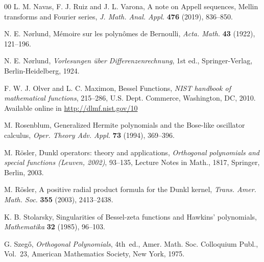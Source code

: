 \documentclass[a4paper]{amsart}
\theoremstyle{plain}
\theoremstyle{definition}
\theoremstyle{remark}
\numberwithin{equation}{section}
\begin{document}
\begin{thebibliography}{00}
L. M. Navas, F. J. Ruiz and J. L. Varona,
A note on Appell sequences, Mellin transforms and Fourier series,
\textit{J. Math. Anal. Appl.}
\textbf{476} (2019), 836--850.

N. E. N{\o}rlund, %
M\'emoire sur les polyn\^omes de Bernoulli,
\textit{Acta. Math.}
\textbf{43} (1922), 121--196.

N. E. N{\o}rlund, %
\textit{Vorlesungen \"uber Differenzenrechnung}, 1st ed.,
Springer-Verlag, Berlin-Heidelberg, 1924.

F. W. J. Olver and L. C. Maximon,
Bessel Functions,
\textit{NIST handbook of mathematical functions},
215--286, %
U.S. Dept. Commerce, Washington, DC, 2010.
Available online in \url{http://dlmf.nist.gov/10}

M. Rosenblum,
{Generalized Hermite polynomials and the Bose-like oscillator calculus},
\textit{Oper. Theory Adv. Appl.}
\textbf{73} (1994), 369--396.

M. R\"osler,
Dunkl operators: theory and applications,
\textit{Orthogonal polynomials and special functions
(Leuven, 2002)}, 93--135,
Lecture Notes in Math., 1817, Springer, Berlin, 2003.

M. R\"osler,
A positive radial product formula for the Dunkl kernel,
\textit{Trans. Amer. Math. Soc.}
\textbf{355} (2003), 2413--2438.


K. B. Stolarsky,
Singularities of Bessel-zeta functions and Hawkins' polynomials,
\textit{Mathematika}
\textbf{32} (1985), 96--103.

G. Szeg\H{o}, 
\textit{Orthogonal Polynomials}, 4th~ed.,
Amer. Math. Soc. Colloquium Publ., Vol.~23, 
American Mathematics Society, New York, 1975.


\end{thebibliography}
\end{document}
